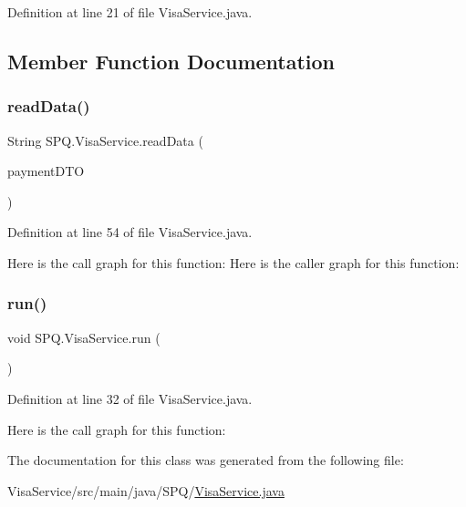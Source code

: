 Definition at line 21 of file Visa\+Service.\+java.



\subsection{Member Function Documentation}
\mbox{\label{class_s_p_q_1_1_visa_service_a9f06022375e8bd98b78a8268bdc4ff05}} 
\subsubsection{\texorpdfstring{read\+Data()}{readData()}}
{\footnotesize\ttfamily String S\+P\+Q.\+Visa\+Service.\+read\+Data (\begin{DoxyParamCaption}\item[{\mbox{\hyperlink{class_s_p_q_1_1dto_1_1_payment_d_t_o}{Payment\+D\+TO}}}]{payment\+D\+TO }\end{DoxyParamCaption})}



Definition at line 54 of file Visa\+Service.\+java.

Here is the call graph for this function\+:
Here is the caller graph for this function\+:
\mbox{\label{class_s_p_q_1_1_visa_service_a4e9434dfb98d1ff247d29794ac96909e}} 
\subsubsection{\texorpdfstring{run()}{run()}}
{\footnotesize\ttfamily void S\+P\+Q.\+Visa\+Service.\+run (\begin{DoxyParamCaption}{ }\end{DoxyParamCaption})}



Definition at line 32 of file Visa\+Service.\+java.

Here is the call graph for this function\+:


The documentation for this class was generated from the following file\+:\begin{DoxyCompactItemize}
\item 
Visa\+Service/src/main/java/\+S\+P\+Q/\mbox{\hyperlink{_visa_service_8java}{Visa\+Service.\+java}}\end{DoxyCompactItemize}

